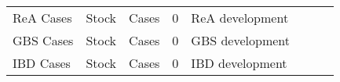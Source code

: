\begin{landscape}
\begin{longtable}[c]{m{10em}lllm{15em}lll}
ReA Cases                                     & Stock    & Cases                    & 0                         & ReA development                                                                                                                                                                                                                                                                          &                                                                                                                                                                                              &                                                                                                                                                                                                                                       \\
GBS Cases                                     & Stock    & Cases                    & 0                         & GBS development                                                                                                                                                                                                                                                                          &                                                                                                                                                                                              &                                                                                                                                                                                                                                       \\
IBD Cases                                     & Stock    & Cases                    & 0                         & IBD development                                                                                                                                                                                                                                                                          &                                                                                                                                                                                              &                                                                                                                                                                                                                                       \\

\end{longtable}
\end{landscape}
